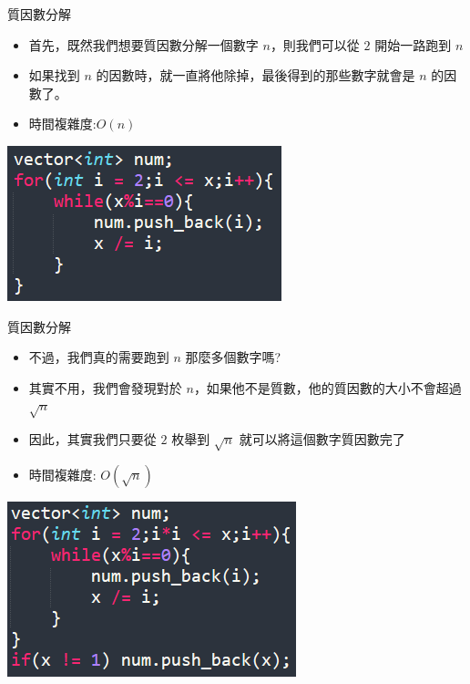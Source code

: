 \documentclass[aspectratio=169]{beamer}
\begin{document}
\begin{frame}[fragile]{質因數分解}
    \begin{itemize}
        \item 首先，既然我們想要質因數分解一個數字 $n$，則我們可以從 $2$ 開始一路跑到 $n$
        \item 如果找到 $n$ 的因數時，就一直將他除掉，最後得到的那些數字就會是 $n$ 的因數了。
        \item 時間複雜度:$O(n)$
    \end{itemize}
    \begin{center}
        \includegraphics[]{images/code1.png}
    \end{center}
\end{frame}

\begin{frame}[fragile]{質因數分解}
    \begin{itemize}
        \item<1-> 不過，我們真的需要跑到 $n$ 那麼多個數字嗎? \pause
        \item<2-> 其實不用，我們會發現對於 $n$，如果他不是質數，他的質因數的大小不會超過 $\sqrt{n}$  \pause
        \item<3-> 因此，其實我們只要從 $2$ 枚舉到 $\sqrt{n}$ 就可以將這個數字質因數完了
        \item<3-> 時間複雜度: $O(\sqrt{n})$
    \end{itemize} 
    \begin{center}
        \includegraphics[]{images/code2.png}
    \end{center}
\end{frame}
\end{document}
